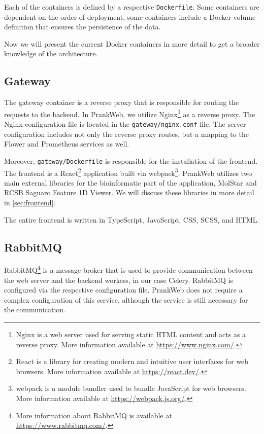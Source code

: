 Each of the containers is defined by a respective \texttt{Dockerfile}. Some containers are dependent on the order of deployment, some containers include a Docker volume definition that ensures the persistence of the data.

Now we will present the current Docker containers in more detail to get a broader knowledge of the architecture.

\subsection{Gateway}
\label{subsec:gateway}

The gateway container is a reverse proxy that is responsible for routing the requests to the backend. In PrankWeb, we utilize Nginx\footnote{Nginx is a web server used for serving static HTML content and acts as a reverse proxy. More information available at \url{https://www.nginx.com/}.} as a reverse proxy. The Nginx configuration file is located in the \texttt{gateway/nginx.conf} file. The server configuration includes not only the reverse proxy routes, but a mapping to the Flower and Prometheus services as well.

Moreover, \texttt{gateway/Dockerfile} is responsible for the installation of the frontend. The frontend is a React\footnote{React is a library for creating modern and intuitive user interfaces for web browsers. More information available at \url{https://react.dev/}.} application built via webpack\footnote{webpack is a module bundler used to bundle JavaScript for web browsers. More information available at \url{https://webpack.js.org/}.}. PrankWeb utilizes two main external libraries for the bioinformatic part of the application, MolStar and RCSB Saguaro Feature 1D Viewer. We will discuss these libraries in more detail in \cref{sec:frontend}.

The entire frontend is written in TypeScript, JavaScript, CSS, SCSS, and HTML.

\subsection{RabbitMQ}
\label{subsec:rabbitmq}

RabbitMQ\footnote{More information about RabbitMQ is available at \url{https://www.rabbitmq.com/}.} is a message broker that is used to provide communication between the web server and the backend workers, in our case Celery. RabbitMQ is configured via the respective configuration file. PrankWeb does not require a complex configuration of this service, although the service is still necessary for the communication.


